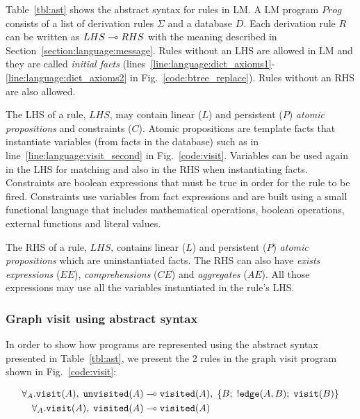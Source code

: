 Table~\ref{tbl:ast} shows the abstract syntax for rules in LM.  A LM program
$Prog$ consists of a list of derivation rules $\Sigma$ and a database $D$.  Each
derivation rule $R$ can be written as $LHS \multimap RHS$ with the meaning
described in Section~\ref{section:language:message}.  Rules without an LHS are
allowed in LM and they are called \emph{initial facts}
(lines~\ref{line:language:dict_axioms1}-\ref{line:language:dict_axioms2} in
Fig.~\ref{code:btree_replace}). Rules without an RHS are also allowed.

The LHS of a rule, $LHS$, may contain linear ($L$) and persistent ($P$)
\emph{atomic propositions} and constraints ($C$). Atomic propositions are template
facts that instantiate variables (from facts in the database) such as
 in line~\ref{line:language:visit_second} in
Fig.~\ref{code:visit}. Variables can be used again in the LHS for matching and
also in the RHS when instantiating facts.  Constraints are boolean expressions
that must be true in order for the rule to be fired. Constraints use variables
from fact expressions and are built using a small functional language that
includes mathematical operations, boolean operations, external functions and
literal values.

The RHS of a rule, $LHS$, contains linear ($L$) and persistent ($P$)
\emph{atomic propositions} which are uninstantiated facts. The RHS can also have
\emph{exists expressions} ($EE$), \emph{comprehensions} ($CE$) and
\emph{aggregates} ($AE$). All those expressions may use all the variables
instantiated in the rule's LHS.

\subsubsection{Graph visit using abstract syntax}\label{visit:ast}

In order to show how programs are represented using the abstract syntax
presented in Table~\ref{tbl:ast}, we present the 2 rules in the graph visit
program shown in Fig.~\ref{code:visit}:

\nopagebreak

\begin{align}
\forall_A. \mathtt{visit}(A), \; \mathtt{unvisited}(A) \multimap & \;
\mathtt{visited}(A), \; \{ B; \; {!} \mathtt{edge}(A, B); \;
\mathtt{visit}(B)\}\\
\forall_A. \mathtt{visit}(A), \; \mathtt{visited}(A) \multimap & \;
\mathtt{visited}(A)
\end{align}

